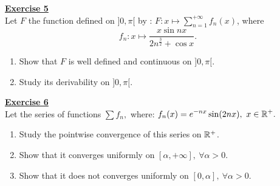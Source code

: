 \noindent\Large{\underline{\textbf{Exercise 5}}}
\normalsize{}\\
\noindent Let $F$ the function defined on $]0, \pi[$ by : $F : x \longmapsto \displaystyle\sum_{n=1}^{+\infty} f_n(x)$, where
$$ f_n : x \longmapsto \dfrac{x \sin nx}{2n^{\frac{3}{2}} + \cos x}. $$
\begin{enumerate}
    \item Show that $F$ is well defined and continuous on $]0, \pi[$.
    \item Study its derivability on $]0, \pi[$.\\
\end{enumerate}

\noindent\Large{\underline{\textbf{Exercise 6}}}
\normalsize{}\\
\noindent Let the series of functions $\displaystyle\sum f_n,$ where: $\displaystyle f_n(x) = e^{-nx}\sin(2nx),\ x\in\mathbb{R}^+.$
\begin{enumerate}
    \item Study the pointwise convergence of this series on $\mathbb{R}^+$.
    \item Show that it converges uniformly on $[\alpha,+\infty],\ \forall \alpha > 0$.
    \item Show that it does not converges uniformly on $[0, \alpha],\ \forall \alpha > 0$.
\end{enumerate}
